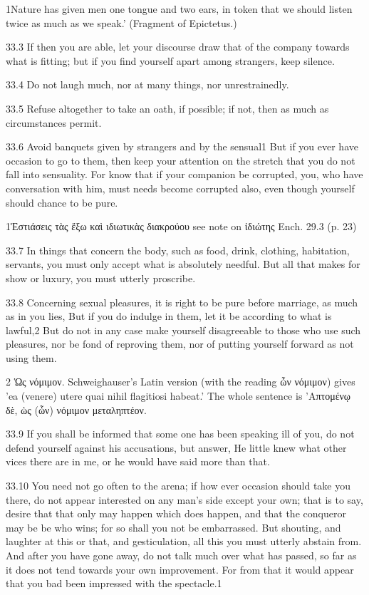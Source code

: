    1Nature has given men one tongue and two ears, in token that we should listen twice as much as we speak.’ (Fragment of Epictetus.)

   33.3   If then you are able, let your discourse draw that of the company towards what is fitting; but if you find yourself apart among strangers, keep silence.

   33.4   Do not laugh much, nor at many things, nor unrestrainedly.

   33.5   Refuse altogether to take an oath, if possible; if not, then as much as circumstances permit.

   33.6   Avoid banquets given by strangers and by the sensual1 But if you ever have occasion to go to them, then keep your attention on the stretch that you do not fall into sensuality. For know that if your companion be corrupted, you, who have conversation with him, must needs become corrupted also, even though yourself should chance to be pure.

   1Ἑστιάσεις τὰς ἔξω καὶ ιδιωτικὰς διακρούου see note on ἰδιώτης  Ench. 29.3 (p. 23)

   33.7   In things that concern the body, such as food, drink, clothing, habitation, servants, you must only accept what is absolutely needful. But all that makes for show or luxury, you must utterly proscribe.

   33.8    Concerning sexual pleasures, it is right to be pure before marriage, as much as in you lies, But if you do indulge in them, let it be according to what is lawful,2 But do not in any case make yourself disagreeable to those who use such pleasures, nor be fond of reproving them, nor of putting yourself forward as not using them.

   2 Ὡς νόμιμον.  Schweighauser's Latin version (with the reading ὧν νόμιμον) gives 'ea (venere) utere quai nihil flagitiosi habeat.' The whole sentence is 'Απτομένῳ δὲ, ὡς (ὧν) νόμιμον μεταληπτέον.

   33.9   If you shall be informed that some one has been speaking ill of you, do not defend yourself against his accusations, but answer, He little knew what other vices there are in me, or he would have said more than that.

   33.10   You need not go often to the arena; if how ever occasion should take you there, do not appear interested on any man’s side except your own; that is to say, desire that that only may happen which does happen, and that the conqueror may be be who wins; for so shall you not be embarrassed. But shouting, and laughter at this or that, and gesticulation, all this you must utterly abstain from.  And after you have gone away, do not talk much over what has passed, so far as it does not tend towards your own improvement. For from that it would appear that you bad been impressed with the spectacle.1

